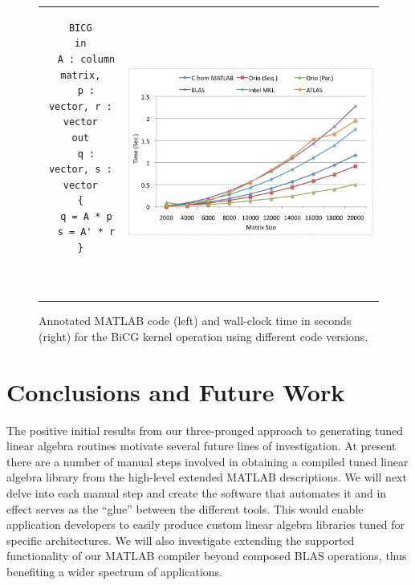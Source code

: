 \documentclass[11pt]{article}
\begin{document}
\begin{figure}[htp]
\centering
\begin{tabular}{cc}
\begin{minipage}[b]{.3\textwidth}
\footnotesize
\begin{verbatim}
BICG
in
  A : column matrix,
  p : vector, r : vector
out
  q : vector, s : vector
{
  q = A * p
  s = A' * r
}



\end{verbatim}
\end{minipage}
&
\begin{minipage}[b]{.6\textwidth}
\includegraphics[width=\textwidth]{figures/bicgkernel.png}
\end{minipage}\\
\end{tabular}
\caption{Annotated MATLAB code (left) and wall-clock time in seconds (right) for the BiCG kernel operation using different code versions.}
\label{fig:bicgkernel}
\end{figure}

\section{Conclusions and Future Work}

The positive initial results from our three-pronged approach to generating tuned linear algebra routines motivate several future lines of investigation. At present there are a number of manual steps involved in obtaining a compiled tuned linear algebra library from the high-level extended MATLAB descriptions. We will next delve into each manual step and create the software that automates it and in effect serves as the ``glue'' between the different tools. This would enable application developers to easily produce custom linear algebra libraries tuned for specific architectures. We will also investigate extending the supported functionality of our MATLAB compiler beyond composed BLAS operations, thus benefiting a wider spectrum of applications. 
\end{document}
